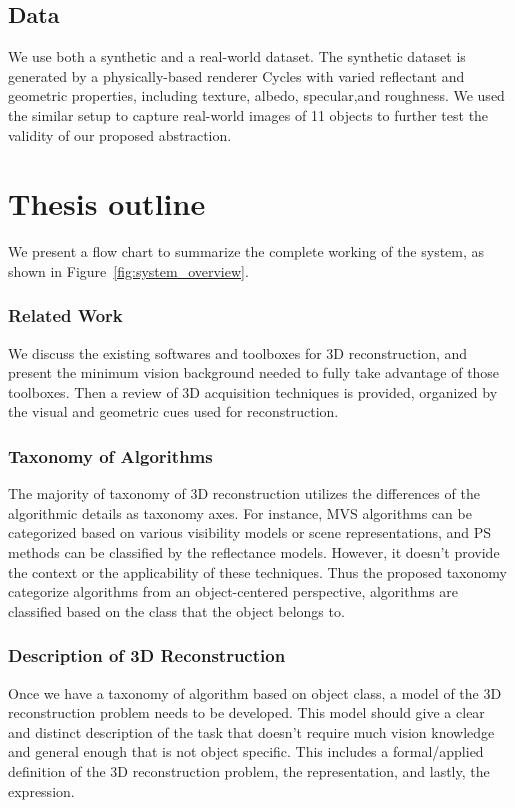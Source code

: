 \subsection{Data}
We use both a synthetic and a real-world dataset. The synthetic dataset is generated by a physically-based renderer Cycles with varied reflectant and geometric properties, including texture, albedo, specular,and roughness. We used the similar setup to capture real-world images of 11 objects to further test the validity of our proposed abstraction.

\section{Thesis outline}
We present a flow chart to summarize the complete working of the system, as shown in Figure~\ref{fig:system_overview}.

\subsubsection{Related Work}
We discuss the existing softwares and toolboxes for 3D reconstruction, and present the minimum vision background needed to fully take advantage of those toolboxes. Then a review of 3D acquisition techniques is provided, organized by the visual and geometric cues used for reconstruction.

\subsubsection{Taxonomy of Algorithms}
The majority of taxonomy of 3D reconstruction utilizes the differences of the algorithmic details as taxonomy axes. For instance, MVS algorithms can be categorized based on various visibility models or scene representations, and PS methods can be classified by the reflectance models. However, it doesn't provide the context or the applicability of these techniques. Thus the proposed taxonomy categorize algorithms from an object-centered perspective, \ie algorithms are classified based on the class that the object belongs to.

\subsubsection{Description of 3D Reconstruction}
Once we have a taxonomy of algorithm based on object class, a model of the 3D reconstruction problem needs to be developed. This model should give a clear and distinct description of the task that doesn't require much vision knowledge and general enough that is not object specific. This includes a formal/applied definition of the 3D reconstruction problem, the representation, and lastly, the expression.

